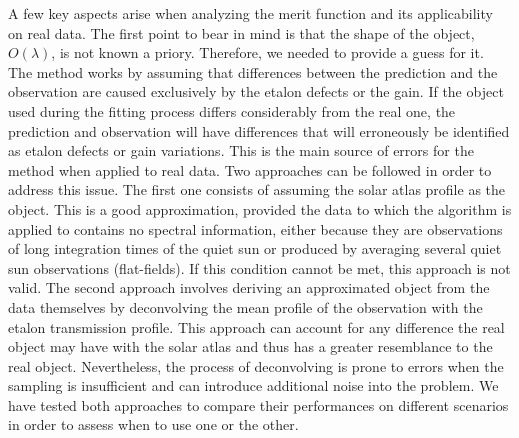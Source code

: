 A few key aspects arise when analyzing the merit function and its applicability on real data. The first point to bear in mind is that the shape of the object, $O(\lambda)$, is not known a priory. Therefore, we needed to provide a guess for it. The method works by assuming that differences between the prediction and the observation are caused exclusively by the etalon defects or the gain. If the object used during the fitting process differs considerably from the real one, the prediction and observation will have differences that will erroneously be identified as etalon defects or gain variations. This is the main source of errors for the method when applied to real data. Two approaches can be followed in order to address this issue. The first one consists of assuming the solar atlas profile as the object. This is a good approximation, provided the data to which the algorithm is applied to contains no spectral information, either because they are observations of long integration times of the quiet sun or produced by averaging several quiet sun observations (flat-fields). If this condition cannot be met, this approach is not valid. The second approach involves deriving an approximated object from the data themselves by deconvolving the mean profile of the observation with the etalon transmission profile. This approach can account for any difference the real object may have with the solar atlas and thus has a greater resemblance to the real object. Nevertheless, the process of deconvolving is prone to errors when the sampling is insufficient and can introduce additional noise into the problem. We have tested both approaches to compare their performances on different scenarios in order to assess when to use one or the other.

